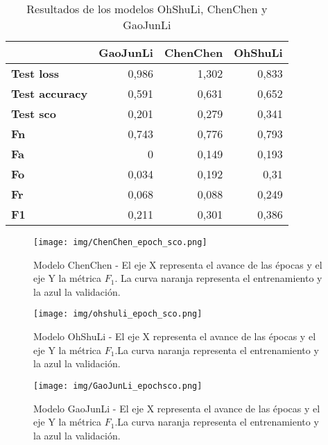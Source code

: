         
        \begin{table}[H]
        \caption{Resultados de los modelos OhShuLi, ChenChen y GaoJunLi}
        \begin{center}
        \begin{tabular}{|l|r|r|r|}
        \hline
         & \multicolumn{1}{l|}{\textbf{GaoJunLi}} & \multicolumn{1}{l|}{\textbf{ChenChen}} & \multicolumn{1}{l|}{\textbf{OhShuLi}} \\ \hline
        \textbf{Test loss} & 0,986 & 1,302 & 0,833 \\ \hline
        \textbf{Test accuracy} & 0,591 & 0,631 & 0,652 \\ \hline
        \textbf{Test sco} & 0,201 & 0,279 & 0,341 \\ \hline
        \textbf{Fn} & 0,743 & 0,776 & 0,793 \\ \hline
        \textbf{Fa} & 0 & 0,149 & 0,193 \\ \hline
        \textbf{Fo} & 0,034 & 0,192 & 0,31 \\ \hline
        \textbf{Fr} & 0,068 & 0,088 & 0,249 \\ \hline
        \textbf{F1} & 0,211 & 0,301 & 0,386 \\ \hline
        \end{tabular}
        \end{center}
        \label{table:results_litera}
        \end{table}


        \begin{figure}[H]
            \centering
            \texttt{[image: img/ChenChen\_epoch\_sco.png]}
            \caption{Modelo ChenChen - El eje X representa el avance de las épocas y el eje Y la métrica $F_1$. La curva naranja representa el entrenamiento y la azul la validación.}
            \label{fig:chenchen_tensorboard}
        \end{figure}
        
        \begin{figure}[H]
            \centering
            \texttt{[image: img/ohshuli\_epoch\_sco.png]}
            \caption{Modelo OhShuLi - El eje X representa el avance de las épocas y el eje Y la métrica $F_1$.La curva naranja representa el entrenamiento y la azul la validación.}
            \label{fig:ohshuli_tensorboard}
        \end{figure}
        
        \begin{figure}[H]
            \centering
            \texttt{[image: img/GaoJunLi\_epochsco.png]}
            \caption{Modelo GaoJunLi - El eje X representa el avance de las épocas y el eje Y la métrica $F_1$.La curva naranja representa el entrenamiento y la azul la validación.}
            \label{fig:gaojunli_tensorboard}
        \end{figure}
    
